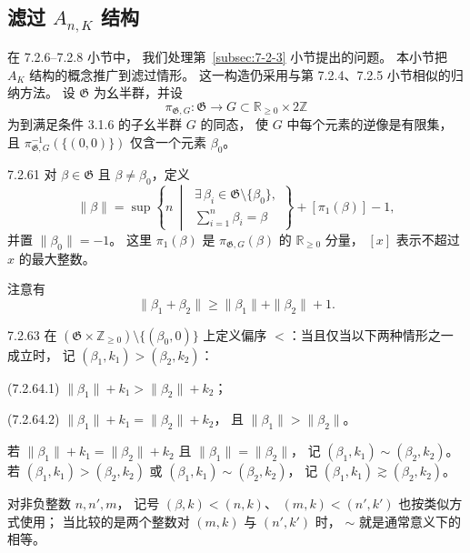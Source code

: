 
\subsection{滤过 $A_{n,K}$ 结构}
\label{subsec:7-2-6}
%
%

在 7.2.6--7.2.8 小节中，
我们处理第~\ref{subsec:7-2-3} 小节提出的问题。
本小节把 $A_K$ 结构的概念推广到滤过情形。
这一构造仍采用与第 7.2.4、7.2.5 小节相似的归纳方法。
设 $\mathfrak G$ 为幺半群，并设
\[
\pi_{\mathfrak G,G}\colon
\mathfrak G\longrightarrow
G\subset\mathbb R_{\ge0}\times2\mathbb Z
\]
为到满足条件 3.1.6 的子幺半群 $G$ 的同态，
使 $G$ 中每个元素的逆像是有限集，
且 $\pi_{\mathfrak G,G}^{-1}(\{(0,0)\})$
仅含一个元素 $\beta_0$。

\begin{definition}{7.2.61}\label{def:7-2-61}
对 $\beta\in\mathfrak G$ 且 $\beta\ne\beta_0$，定义
\[
\|\beta\|=
\sup\left\{n\ \middle|\
\begin{gathered}
\exists\,\beta_i\in\mathfrak G\setminus\{\beta_0\},\\[-2pt]
\sum_{i=1}^{n}\beta_i=\beta
\end{gathered}\right\}
+[\pi_1(\beta)]-1,
\]
并置 $\|\beta_0\|=-1$。
这里 $\pi_1(\beta)$ 是
$\pi_{\mathfrak G,G}(\beta)$ 的 $\mathbb R_{\ge0}$ 分量，
$[x]$ 表示不超过 $x$ 的最大整数。
\end{definition}

注意有
\begin{equation}
\|\beta_1+\beta_2\|
\ge\|\beta_1\|+\|\beta_2\|+1.
\tag{7.2.62}\label{eq:7-2-62}
\end{equation}

\begin{definition}{7.2.63}\label{def:7-2-63}
在
$(\mathfrak G\times\mathbb Z_{\ge0})
\setminus\{(\beta_0,0)\}$
上定义偏序 $<$：当且仅当以下两种情形之一成立时，
记 $(\beta_1,k_1)>(\beta_2,k_2)$：

\noindent\textup{(7.2.64.1)}\quad
$\|\beta_1\|+k_1>\|\beta_2\|+k_2$；

\noindent\textup{(7.2.64.2)}\quad
$\|\beta_1\|+k_1=\|\beta_2\|+k_2$，
且 $\|\beta_1\|>\|\beta_2\|$。

若
$\|\beta_1\|+k_1=\|\beta_2\|+k_2$
且 $\|\beta_1\|=\|\beta_2\|$，
记 $(\beta_1,k_1)\sim(\beta_2,k_2)$。
若 $(\beta_1,k_1)>(\beta_2,k_2)$
或 $(\beta_1,k_1)\sim(\beta_2,k_2)$，
记 $(\beta_1,k_1)\gtrsim(\beta_2,k_2)$。

对非负整数 $n,n',m$，
记号 $(\beta,k)<(n,k)$、
$(m,k)<(n',k')$ 也按类似方式使用；
当比较的是两个整数对 $(m,k)$ 与 $(n',k')$ 时，
$\sim$ 就是通常意义下的相等。
\end{definition}

